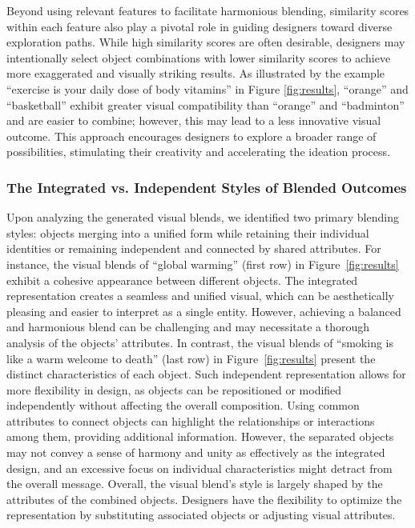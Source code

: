 Beyond using relevant features to facilitate harmonious blending, similarity scores within each feature also play a pivotal role in guiding designers toward diverse exploration paths. 
While high similarity scores are often desirable, designers may intentionally select object combinations with lower similarity scores to achieve more exaggerated and visually striking results.
As illustrated by the example ``exercise is your daily dose of body vitamins'' in Figure \ref{fig:results}, ``orange'' and ``basketball'' exhibit greater visual compatibility than ``orange'' and ``badminton'' and are easier to combine; however, this may lead to a less innovative visual outcome.
This approach encourages designers to explore a broader range of possibilities, stimulating their creativity and accelerating the ideation process.






\subsubsection{The Integrated vs. Independent Styles of Blended Outcomes}

Upon analyzing the generated visual blends, we identified two primary blending styles: objects merging into a unified form while retaining their individual identities or remaining independent and connected by shared attributes.
For instance, the visual blends of ``global warming'' (first row) in Figure~\ref{fig:results} exhibit a cohesive appearance between different objects.
The integrated representation creates a seamless and unified visual, which can be aesthetically pleasing and easier to interpret as a single entity.
However, achieving a balanced and harmonious blend can be challenging and may necessitate a thorough analysis of the objects' attributes.
In contrast, the visual blends of ``smoking is like a warm welcome to death'' (last row) in Figure~\ref{fig:results} present the distinct characteristics of each object.
Such independent representation allows for more flexibility in design, as objects can be repositioned or modified independently without affecting the overall composition. 
Using common attributes to connect objects can highlight the relationships or interactions among them, providing additional information.
However, the separated objects may not convey a sense of harmony and unity as effectively as the integrated design, and an excessive focus on individual characteristics might detract from the overall message.
Overall, the visual blend's style is largely shaped by the attributes of the combined objects. 
Designers have the flexibility to optimize the representation by substituting associated objects or adjusting visual attributes.








